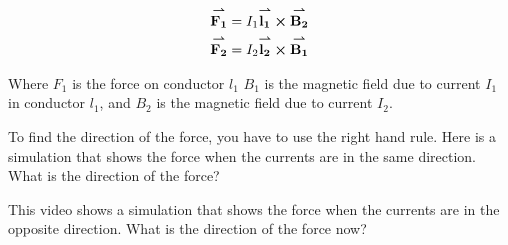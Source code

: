 \documentclass{ximera}
\begin{document}
\begin{eqnarray}
{\overset{\boldsymbol{\rightharpoonup}}{\mathbf{F_1}}}\hspace{0in}=I_1 {\overset{\boldsymbol{\rightharpoonup}}{\mathbf{l_1}}}\hspace{0in} \boldsymbol\times {\overset{\boldsymbol{\rightharpoonup}}{\mathbf{B_2}}}\hspace{0in} \\
{\overset{\boldsymbol{\rightharpoonup}}{\mathbf{F_2}}}\hspace{0in}=I_2 {\overset{\boldsymbol{\rightharpoonup}}{\mathbf{l_2}}}\hspace{0in} \boldsymbol\times {\overset{\boldsymbol{\rightharpoonup}}{\mathbf{B_1}}}\hspace{0in}
\end{eqnarray}

Where $F_1$ is the force on conductor $l_1$ $B_1$ is the magnetic field due to current $I_1$ in conductor $l_1$, and $B_2$ is the magnetic field due to current $I_2$.

To find the direction of the force, you have to use the right hand rule. Here is a simulation that shows the force when the currents are in the same direction. What is the direction of the force?

\begin{center}  
\end{center} 

This video shows a simulation that shows the force when the currents are in the opposite direction. What is the direction of the force now?


\begin{center}  
\end{center} 
\end{document}
